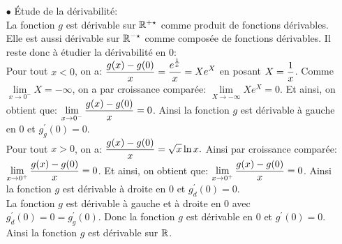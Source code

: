 \documentclass[a4paper, 11pt,reqno]{article}
\begin{document}
\begin{correction}
\begin{enumerate}
\begin{itemize}
			            \noindent $\lim\limits_{x\to 0^-} g(x)=\lim\limits_{x\to 0^-} e^{\frac{1}{x}}=0$ par propri\'et\'e sur la composition de limite.\\
			            \noindent $\lim\limits_{x\to 0^+} g(x)=\lim\limits_{x\to 0^+} x^{\frac{3}{2}}\ln{x}=0$ par croissance compar\'ee.\\
			            \noindent Ainsi, on a: $\lim\limits_{x\to 0^-} g(x)=\lim\limits_{x\to 0^+} g(x)=g(0)$ donc la fonction $g$ est aussi continue en 0.\\
			            \noindent Ainsi la fonction $g$ est continue sur $\R$.
			      \item[$\bullet$] \'Etude de la d\'erivabilit\'e:\\
			            \noindent La fonction $g$ est d\'erivable sur $\mathbb{R}^{+\star}$ comme produit de fonctions d\'erivables. Elle est aussi d\'erivable sur $\mathbb{R}^{-\star}$ comme compos\'ee de fonctions d\'erivables. Il reste donc \`{a} \'etudier la d\'erivabilit\'e en 0: \\
			            \noindent Pour tout $x<0$, on a: $\displaystyle\frac{g(x)-g(0)}{x}=\displaystyle\frac{e^{\frac{1}{x}}}{x}=Xe^X$ en posant $X=\displaystyle\frac{1}{x}$. Comme $\lim\limits_{x\to 0^-} X=-\infty$, on a par croissance compar\'ee: $\lim\limits_{X\to -\infty} Xe^X=0$. Et ainsi, on obtient que: $\lim\limits_{x\to 0^-} \displaystyle\frac{g(x)-g(0)}{x}=0$. Ainsi la fonction $g$ est d\'erivable \`{a} gauche en 0 et $g^{\prime}_g(0)=0$. \\
			            \noindent Pour tout $x>0$, on a: $\displaystyle\frac{g(x)-g(0)}{x}=\sqrt{x}\ln{x}.$ Ainsi par croissance compar\'ee: $\lim\limits_{x\to 0^+} \displaystyle\frac{g(x)-g(0)}{x}=0$. Et ainsi, on obtient que: $\lim\limits_{x\to 0^+} \displaystyle\frac{g(x)-g(0)}{x}=0$. Ainsi la fonction $g$ est d\'erivable \`{a} droite en 0 et $g^{\prime}_d(0)=0$. \\
			            \noindent La fonction $g$ est d\'erivable \`{a} gauche et \`{a} droite en 0 avec $g^{\prime}_d(0)=0=g^{\prime}_g(0)$. Donc la fonction $g$ est d\'erivable en 0 et $g^{\prime}(0)=0$.\\
			            \noindent Ainsi la fonction $g$ est d\'erivable sur $\R$.
		      \end{itemize}
	\end{enumerate}
\end{correction}
\end{document}
